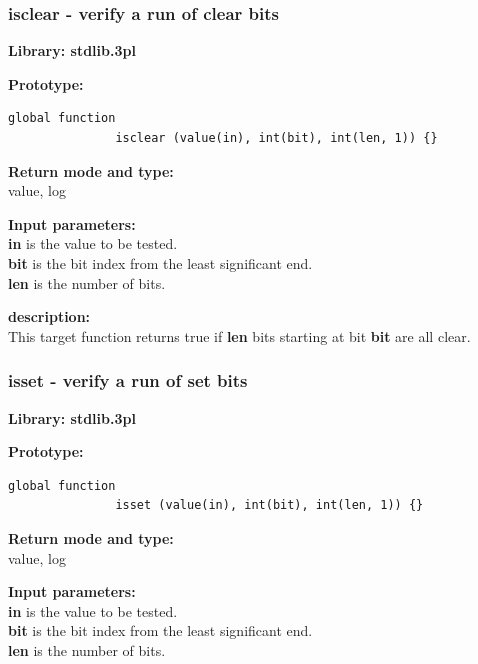         \subsubsection{isclear - verify a run of clear bits}\label{sec:lfisclear}

            {\bf Library: stdlib.3pl}

            {\bf Prototype:} \\
            \vsp
            \begin{lstlisting}[gobble=12, language=threepl]
               global function
               isclear (value(in), int(bit), int(len, 1)) {}
            \end{lstlisting}

            {\bf Return mode and type:} \\
            value, log

            {\bf Input parameters:} \\            
            {\bf in} is the value to be tested. \\
            {\bf bit} is the bit index from the least significant end. \\
            {\bf len} is the number of bits.

            {\bf description:} \\
            This target function returns true if {\bf len} bits starting at
            bit {\bf bit} are all clear.



        \subsubsection{isset - verify a run of set bits}\label{sec:lfisset}

            {\bf Library: stdlib.3pl}

            {\bf Prototype:} \\
            \vsp
            \begin{lstlisting}[gobble=12, language=threepl]
               global function
               isset (value(in), int(bit), int(len, 1)) {}
            \end{lstlisting}

            {\bf Return mode and type:} \\
            value, log

            {\bf Input parameters:} \\            
            {\bf in} is the value to be tested. \\
            {\bf bit} is the bit index from the least significant end. \\
            {\bf len} is the number of bits.


